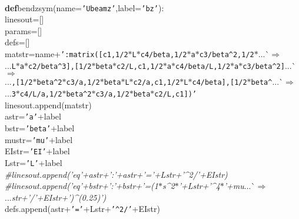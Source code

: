 {{\begin{tabbing}
\\
{\textbf{def}}\hspace{5pt}bendzsym(name={\texttt{{'}Ubeamz{'}}},label={\texttt{{'}bz{'}}}):
\\
\hspace{20pt}linesout={[}{]}
\\
\hspace{20pt}params={[}{]}
\\
\hspace{20pt}defs={[}{]}
\\
\hspace{20pt}matstr=name+{\texttt{{'}:matrix({[}c1,1/2$\ast$L$\ast$c4/beta,\dash{}1/2$\ast$a$\ast$c3/beta\^{}2,\dash{}1/2$\ast$}}{}...\`$\Rightarrow$\\
...{}{\texttt{L$\ast$a$\ast$c2/beta\^{}3{]},{[}1/2$\ast$beta$\ast$c2/L,c1,1/2$\ast$a$\ast$c4/beta/L,1/2$\ast$a$\ast$c3/beta\^{}2{]}}}{}...\`$\Rightarrow$\\
...{}{\texttt{,{[}\dash{}1/2$\ast$beta\^{}2$\ast$c3/a,1/2$\ast$beta$\ast$L$\ast$c2/a,c1,\dash{}1/2$\ast$L$\ast$c4/beta{]},{[}\dash{}1/2$\ast$beta\^{}}}{}...\`$\Rightarrow$\\
...{}{\texttt{3$\ast$c4/L/a,1/2$\ast$beta\^{}2$\ast$c3/a,\dash{}1/2$\ast$beta$\ast$c2/L,c1{]}){'}}}
\\
\hspace{20pt}linesout.append(matstr)
\\
\hspace{20pt}astr={\texttt{{'}a{'}}}+label
\\
\hspace{20pt}bstr={\texttt{{'}beta{'}}}+label
\\
\hspace{20pt}mustr={\texttt{{'}mu{'}}}+label
\\
\hspace{20pt}EIstr={\texttt{{'}EI{'}}}+label
\\
\hspace{20pt}Lstr={\texttt{{'}L{'}}}+label
\\
{\it{\#\hspace{20pt}linesout.append({'}eq{'}+astr+{'}:{'}+astr+{'}={'}+Lstr+{'}\^{}2/{'}+EIstr)
}}\\
{\it{\#\hspace{20pt}linesout.append({'}eq{'}+bstr+{'}:{'}+bstr+{'}=(\dash{}1$\ast$s\^{}2$\ast${'}+Lstr+{'}\^{}4$\ast${'}+mu}}{}...\`$\Rightarrow$\\
...{}{\it{str+{'}/{'}+EIstr+{'})\^{}(0.25){'})
}}\\
\hspace{20pt}defs.append(astr+{\texttt{{'}={'}}}+Lstr+{\texttt{{'}\^{}2/{'}}}+EIstr)

\end{tabbing}}}
